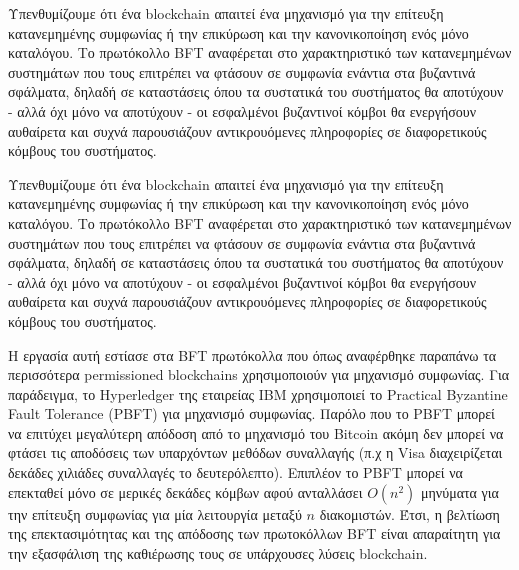 Υπενθυμίζουμε ότι ένα blockchain απαιτεί ένα μηχανισμό για την επίτευξη κατανεμημένης συμφωνίας ή την επικύρωση και την κανονικοποίηση ενός μόνο καταλόγου. Το πρωτόκολλο BFT αναφέρεται στο χαρακτηριστικό των κατανεμημένων συστημάτων που τους επιτρέπει να φτάσουν σε συμφωνία ενάντια στα βυζαντινά σφάλματα, δηλαδή σε καταστάσεις όπου τα συστατικά του συστήματος θα αποτύχουν - αλλά όχι μόνο να αποτύχουν - οι εσφαλμένοι βυζαντινοί κόμβοι θα ενεργήσουν αυθαίρετα και συχνά παρουσιάζουν αντικρουόμενες πληροφορίες σε διαφορετικούς κόμβους του συστήματος.

Υπενθυμίζουμε ότι ένα blockchain απαιτεί ένα μηχανισμό για την επίτευξη κατανεμημένης συμφωνίας ή την επικύρωση και την κανονικοποίηση ενός μόνο καταλόγου. Το πρωτόκολλο BFT αναφέρεται στο χαρακτηριστικό των κατανεμημένων συστημάτων που τους επιτρέπει να φτάσουν σε συμφωνία ενάντια στα βυζαντινά σφάλματα, δηλαδή σε καταστάσεις όπου τα συστατικά του συστήματος θα αποτύχουν - αλλά όχι μόνο να αποτύχουν - οι εσφαλμένοι βυζαντινοί κόμβοι θα ενεργήσουν αυθαίρετα και συχνά παρουσιάζουν αντικρουόμενες πληροφορίες σε διαφορετικούς κόμβους του συστήματος.

Η εργασία αυτή εστίασε στα BFT πρωτόκολλα που όπως αναφέρθηκε παραπάνω τα περισσότερα permissioned blockchains χρησιμοποιούν για μηχανισμό συμφωνίας. Για παράδειγμα, το Hyperledger της εταιρείας IBM \cite{hyperledgeribm} χρησιμοποιεί το Practical Byzantine Fault Tolerance (PBFT) \cite{pbft} για μηχανισμό συμφωνίας. Παρόλο που το PBFT μπορεί να επιτύχει μεγαλύτερη απόδοση από το μηχανισμό του Bitcoin ακόμη δεν μπορεί να φτάσει τις αποδόσεις των υπαρχόντων μεθόδων συναλλαγής (π.χ η Visa διαχειρίζεται δεκάδες χιλιάδες συναλλαγές το δευτερόλεπτο). Επιπλέον το PBFT μπορεί να επεκταθεί μόνο σε μερικές δεκάδες κόμβων αφού ανταλλάσει $O(n^{2})$ μηνύματα για την επίτευξη συμφωνίας για μία λειτουργία μεταξύ $n$ διακομιστών. Έτσι, η βελτίωση της επεκτασιμότητας και της απόδοσης των πρωτοκόλλων BFT είναι απαραίτητη για την εξασφάλιση της καθιέρωσης τους σε υπάρχουσες λύσεις blockchain.

